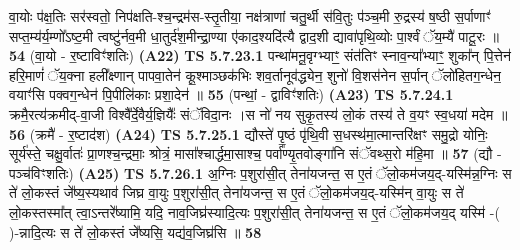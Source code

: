 \documentclass[17pt]{extarticle}
\begin{document}
                  वा॒योः प॑क्ष॒तिः सर॑स्वतो॒ निप॑क्षति-श्च॒न्द्रम॑स-स्तृ॒तीया॒ नक्ष॑त्राणां चतु॒र्थी स॑वि॒तुः प॑ञ्च॒मी रु॒द्रस्य॑ ष॒ष्ठी स॒र्पाणाꣳ॑ सप्त॒म्य॑र्य॒म्णो᳚ऽष्ट॒मी त्वष्टु॑र्नव॒मी धा॒तुर्द॑श॒मीन्द्रा॒ण्या ए॑काद॒श्यदि॑त्यै द्वाद॒शी द्यावा॑पृथि॒व्योः पा॒र्श्वं ॅय॒म्यै॑ पाटू॒रः ॥ \textbf{  54 } \newline
                  \newline
                      (वा॒यो - र॒ष्टाविꣳ॑शतिः)  \textbf{(A22)} \newline \newline
                                        \textbf{ TS 5.7.23.1} \newline
                  पन्था॑मनू॒वृग्भ्याꣳ॒॒ संत॑तिꣳ स्नाव॒न्या᳚भ्याꣳ॒॒ शुका᳚न् पि॒त्तेन॑ हरि॒माणं॑ ॅय॒क्ना हली᳚क्ष्णान् पापवा॒तेन॑ कू॒श्माञ्छक॑भिः शव॒र्तानूव॑द्ध्येन॒ शुनो॑ वि॒शस॑नेन स॒र्पान् ॅलो॑हितग॒न्धेन॒ वयाꣳ॑सि पक्वग॒न्धेन॑ पि॒पीलि॑काः प्रशा॒देन॑ ॥ \textbf{  55 } \newline
                  \newline
                      (पन्थां॒ - द्वाविꣳ॑शतिः)  \textbf{(A23)} \newline \newline
                                        \textbf{ TS 5.7.24.1} \newline
                  क्रमै॒रत्य॑क्रमीद्-वा॒जी विश्वै᳚र्दे॒वैर्य॒ज्ञियैः᳚ संॅविदा॒नः ।स नो॑ नय सुकृ॒तस्य॑ लो॒कं तस्य॑ ते व॒यꣳ स्व॒धया॑ मदेम ॥ \textbf{  56} \newline
                  \newline
                      (क्रमै॑ - र॒ष्टाद॑श)  \textbf{(A24)} \newline \newline
                                        \textbf{ TS 5.7.25.1} \newline
                  द्यौस्ते॑ पृ॒ष्ठं पृ॑थि॒वी स॒धस्थ॑मा॒त्मान्तरि॑क्षꣳ समु॒द्रो योनिः॒ सूर्य॑स्ते॒ चक्षु॒र्वातः॑ प्रा॒णश्च॒न्द्रमाः॒ श्रोत्रं॒ मासा᳚श्चार्द्धमा॒साश्च॒ पर्वा᳚ण्यृ॒तवोङ्गा॑नि संॅवथ्स॒रो म॑हि॒मा ॥ \textbf{  57} \newline
                  \newline
                      (द्यौ - पञ्च॑विꣳशतिः)  \textbf{(A25)} \newline \newline
                                        \textbf{ TS 5.7.26.1} \newline
                  अ॒ग्निः प॒शुरा॑सी॒त् तेना॑यजन्त॒ स ए॒तं ॅलो॒कम॑जय॒द्-यस्मि॑न्न॒ग्निः स ते॑ लो॒कस्तं जे᳚ष्य॒स्यथाव॑ जिघ्र वा॒युः प॒शुरा॑सी॒त् तेना॑यजन्त॒ स ए॒तं ॅलो॒कम॑जय॒द्-यस्मि॑न् वा॒युः स ते॑ लो॒कस्तस्मा᳚त् त्वा॒ऽन्तरे᳚ष्यामि॒ यदि॒ नाव॒जिघ्र॑स्यादि॒त्यः प॒शुरा॑सी॒त् तेना॑यजन्त॒ स ए॒तं ॅलो॒कम॑जय॒द् यस्मि॑ -( )-न्नादि॒त्यः स ते॑ लो॒कस्तं जे᳚ष्यसि॒ यद्य॑व॒जिघ्र॑सि ॥ \textbf{  58 } \newline
\end{document}
